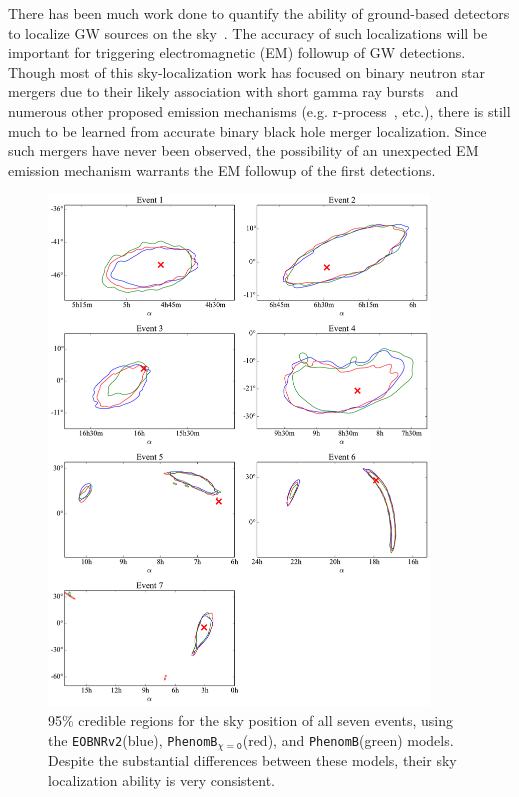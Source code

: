 \documentclass[12pt]{iopart}
\newcommand{\eob}{\texttt{EOBNRv2}\xspace}
\newcommand{\imr}{\texttt{PhenomB}\xspace}
\newcommand{\imrns}{\texttt{PhenomB$_\mathtt{\chi=0}$}\xspace}
\begin{document}
There has been much work done to quantify the ability of ground-based detectors
to localize GW sources on the
sky~\cite{Veitch:2012df,Aasi:2013wya,Nissanke:2011ax,Fairhurst:2010is}.  The
accuracy of such localizations will be important for triggering electromagnetic
(EM) followup of GW detections.  Though most of this sky-localization work has 
focused on binary
neutron star mergers due to their likely association with short gamma ray
bursts~\cite{Eichler:1989ve,Narayan:1992iy,Fong:2013iia} and numerous other
proposed emission mechanisms (e.g.  r-process~\cite{Rosswog:2000qm}, etc.),
there is still much to be learned from accurate binary black hole merger
localization.  Since such mergers have never been observed, the possibility of
an unexpected EM emission mechanism warrants the EM followup of the first
detections.

\begin{figure}[t]
  \includegraphics[width=0.9\textwidth]{figure10}
  \caption{\label{fig:PE_skyLoc} 95\% credible regions for the sky position
      of all seven events, using the \eob (blue), \imrns (red), and \imr (green)
      models.  Despite the substantial differences between these models,
      their sky localization ability is very consistent.}
\end{figure}
\end{document}
